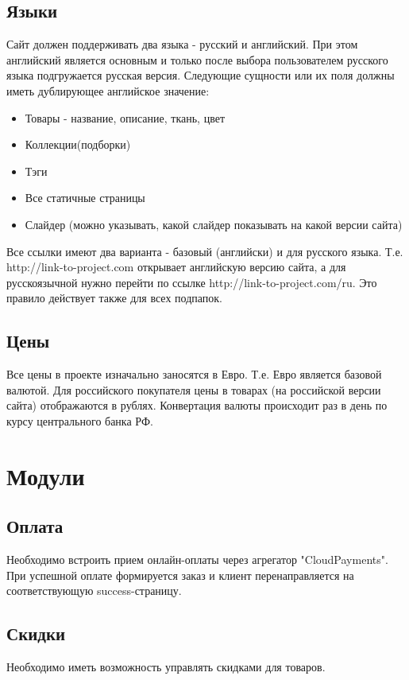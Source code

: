 \documentclass[DIV=calc, paper=a4, fontsize=11pt]{scrartcl} %
\begin{document}
\subsection{Языки}
Сайт должен поддерживать два языка - русский и английский. При этом английский является основным и только после выбора пользователем русского языка подгружается русская версия. Следующие сущности или их поля должны иметь дублирующее английское значение:
\begin{itemize}
	\item Товары - название, описание, ткань, цвет
	\item Коллекции(подборки)
	\item Тэги
	\item Все статичные страницы
	\item Слайдер (можно указывать, какой слайдер показывать на какой версии сайта)
\end{itemize}
Все ссылки имеют два варианта - базовый (английски) и для русского языка. Т.е. http://link-to-project.com открывает английскую версию сайта, а для русскоязычной нужно перейти по ссылке http://link-to-project.com/ru. Это правило действует также для всех подпапок.

\subsection{Цены}
Все цены в проекте изначально заносятся в Евро. Т.е. Евро является базовой валютой. Для российского покупателя цены в товарах (на российской версии сайта) отображаются в рублях. Конвертация валюты происходит раз в день по курсу центрального банка РФ.


\section{Модули}

\subsection{Оплата}
Необходимо встроить прием онлайн-оплаты через агрегатор "CloudPayments". При успешной оплате формируется заказ и клиент перенаправляется на соответствующую success-страницу.

\subsection{Скидки}
Необходимо иметь возможность управлять скидками для товаров.
\end{document}
